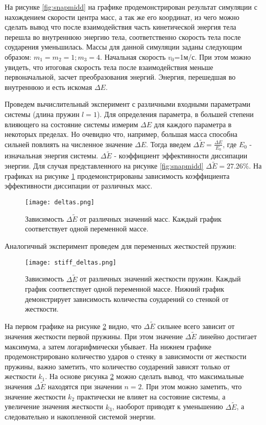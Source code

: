 На рисунке \ref{fig:snapmidd} на графике продемонстрирован результат симуляции с нахождением скорости центра масс, а так же его координат, из чего можно сделать вывод что после взаимодействия часть кинетической энергия тела перешла во внутреннюю энергию тела, соответственно скорость тела после соударения уменьшилась. Массы для данной симуляции заданы следующим образом: $m_1 = m_2 = 1; m_3 = 4$. Начальная скорость $v_0$=1м/с. При этом можно увидеть, что итоговая скорость тела после взаимодействия меньше первоначальной, засчет преобразования энергий. Энергия, перешедшая во внутреннюю и есть искомая $\Delta E$.

Проведем вычислительный эксперимент с различными входными параметрами системы (длина пружин $l=1$). Для определения параметра, в большей степени влияющего на состояние системы измерим $\Delta E$ для каждого параметра в некоторых пределах. Но очевидно что, например, большая масса способна сильней повлиять на численное значение $\Delta E$. Тогда введем $\Delta \tilde{E} = \frac{\Delta E}{E_0}$, где $E_0$ - изначальная энергия системы. $\Delta \tilde{E}$ - коэффициент эффективности диссипации энергии. Для случая представленного на рисунке \ref{fig:snapmidd} $\Delta \tilde{E} = 27.26\%$. На графиках на рисунке \ref{fig:deltas} продемонстрированы зависимость коэффициента эффективности диссипации от различных масс.


\begin{figure}[b!]
    \centering
    \texttt{[image: deltas.png]}
    \caption{Зависимость $\Delta \tilde{E}$ от различных значений масс. Каждый график соответствует одной переменной массе.}
    \label{fig:deltas}
\end{figure}

Аналогичный эксперимент проведем для переменных жесткостей пружин:

\begin{figure}[b!]
    \centering
    \texttt{[image: stiff\_deltas.png]}
    \caption{Зависимость $\Delta \tilde{E}$ от различных значений жесткости пружин. Каждый график соответствует одной переменной массе. Нижний график демонстрирует зависимость количества соударений со стенкой от жесткости.}
    \label{fig:stiff_deltas}
\end{figure}

На первом графике на рисунке \ref{fig:stiff_deltas} видно, что $\Delta \tilde{E}$ сильнее всего зависит от значения жесткости первой пружины. При этом значение $\Delta \tilde{E}$ линейно достигает максимума, а затем логарифмически убывает. На нижнем графике продемонстрировано количество ударов о стенку в зависимости от жесткости пружины, важно заметить, что количество соударений зависят только от жесткости $k_1$. На основе рисунка \ref{fig:stiff_deltas}  можно сделать вывод, что максимальные значения $\Delta \tilde{E}$ находятся при значении $n=2$. При этом можно заметить, что значение жесткости $k_2$ практически не влияет на состояние системы, а увеличение значения жесткости $k_3$, наоборот приводят к уменьшению $\Delta \tilde{E}$, а следовательно и накопленной системой энергии.

